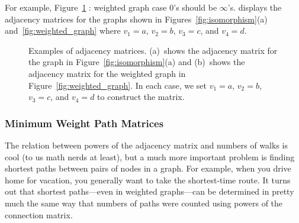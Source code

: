 \begin{editingnotes}
For example, Figure~\ref{fig:adjacency_matrix}
: weighted graph case 0's should be $\infty$'s.
displays the adjacency
matrices for the graphs shown in Figures~\ref{fig:isomorphism}(a)
and~\ref{fig:weighted_graph} where $v_1 = a$, $v_2 = b$, $v_3 = c$,
and $v_4 = d$.

\begin{figure}\redrawntrue
\normalbaselines
{}
\qquad
{}

\caption{Examples of adjacency matrices.  (a)~shows the adjacency
  matrix for the graph in Figure~\ref{fig:isomorphism}(a) and
  (b)~shows the adjacency matrix for the weighted graph in
  Figure~\ref{fig:weighted_graph}.  In each case, we  set $v_1
  = a$, $v_2 = b$, $v_3 = c$, and $v_4 = d$ to construct the matrix.}
\label{fig:adjacency_matrix}
\end{figure}

\subsubsection{Minimum Weight Path  Matrices}
The relation between powers of the adjacency matrix and numbers of
walks is cool (to us math nerds at least), but a much more important
problem is finding  shortest paths between
pairs of nodes in a graph.  For example, when you drive home for
vacation, you generally want to take the shortest-time route.  It
turns out that shortest paths---even in weighted graphs---can be
determined in pretty much the same way that numbers of paths were
counted using powers of the connection matrix.


\end{editingnotes}

